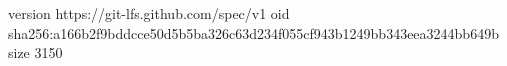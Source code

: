 version https://git-lfs.github.com/spec/v1
oid sha256:a166b2f9bddcce50d5b5ba326c63d234f055cf943b1249bb343eea3244bb649b
size 3150
